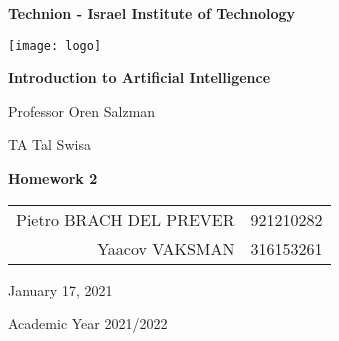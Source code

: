 \begin{titlepage}
\begin{center}
    \textbf{\LARGE Technion - Israel Institute of Technology}

    \vspace{1.5cm}

    \texttt{[image: logo]}

    \vspace{2.5cm}

    \textbf{\LARGE Introduction to Artificial Intelligence}

    \vspace{1cm}

    {\Large Professor Oren Salzman}

    \vspace{2mm}

    {\Large TA Tal Swisa}

    \vfill

    \textbf{\Huge Homework 2}

    \vspace{2cm}

    \begin{tabular}[c]{ r l } %
        Pietro BRACH DEL PREVER & 921210282\\
        Yaacov VAKSMAN  & 316153261\\

    \end{tabular}

    \vspace{2cm}

    {\normalsize January 17, 2021}

    \vspace{1mm}

    {\normalsize Academic Year 2021/2022}
\end{center}
\end{titlepage}
